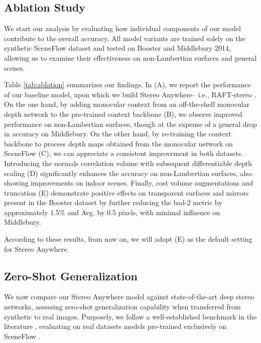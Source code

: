 \documentclass[10pt,twocolumn,letterpaper]{article}
\newcommand{\method}[0]{Stereo Anywhere\xspace}
\begin{document}
\phantom{Invisible Text}
\vspace{-\baselineskip}

\subsection{Ablation Study}


We start our analysis by evaluating how individual components of our model contribute to the overall accuracy. All model variants are trained solely on the synthetic SceneFlow dataset and tested on Booster and Middlebury 2014, allowing us to examine their effectiveness on non-Lambertian surfaces and general scenes.

Table \ref{tab:ablation} summarizes our findings. In (A), we report the performance of our baseline model, upon which we build \method -- i.e., RAFT-stereo \cite{lipson2021raft}. On the one hand, by adding monocular context from an off-the-shelf monocular depth network to the pre-trained context backbone (B), we observe improved performance on non-Lambertian surfaces, though at the expense of a general drop in accuracy on Middlebury. On the other hand, by re-training the context backbone to process depth maps obtained from the monocular network on SceneFlow (C), we can appreciate a consistent improvement in both datasets.
Introducing the normals correlation volume with subsequent differentiable depth scaling (D) significantly enhances the accuracy on non-Lambertian surfaces, also showing improvements on indoor scenes.
Finally, cost volume augmentations and truncation (E) demonstrate positive effects on transparent surfaces and mirrors present in the Booster dataset by further reducing the bad-2 metric by approximately 1.5\% and Avg. by 0.5 pixels, with minimal influence on Middlebury.

According to these results, from now on, we will adopt (E) as the default setting for \method.


\phantom{Invisible Text}
\vspace{-\baselineskip}

\subsection{Zero-Shot Generalization}


We now compare our \method model against state-of-the-art deep stereo networks, assessing zero-shot generalization capability when transferred from synthetic to real images.
Purposely, we follow a well-established benchmark in the literature \cite{lipson2021raft,Tosi_2023_CVPR}, evaluating on real datasets models pre-trained exclusively on SceneFlow \cite{mayer2016large}.
\end{document}
